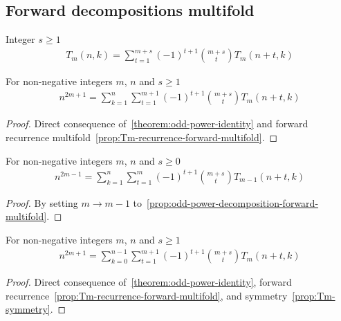 \subsection{Forward decompositions multifold}
\label{subsec:forward-decompositions-multifold}
\begin{proposition}
    Integer $s \geq 1$
    \label{prop:Tm-recurrence-forward-multifold}
    \begin{align*}
        T_{m} (n,k) = \sum_{t=1}^{m+s} (-1)^{t+1} \binom{m+s}{t} T_{m} (n+t, k)
    \end{align*}
\end{proposition}

\begin{proposition}
    \label{prop:odd-power-decomposition-forward-multifold}
    For non-negative integers $m$, $n$ and $s \geq 1$
    \begin{align*}
        n^{2m+1} = \sum_{k=1}^{n} \sum_{t=1}^{m+1} (-1)^{t+1} \binom{m+s}{t} T_{m} (n+t, k)
    \end{align*}
    \begin{proof}
        Direct consequence of~\eqref{theorem:odd-power-identity}
        and forward recurrence multifold~\eqref{prop:Tm-recurrence-forward-multifold}.
    \end{proof}
\end{proposition}

\begin{proposition}
    \label{prop:odd-power-decomposition-forward-m-1-multifold}
    For non-negative integers $m$, $n$ and $s\geq 0$
    \begin{align*}
        n^{2m-1} = \sum_{k=1}^{n} \sum_{t=1}^{m} (-1)^{t+1} \binom{m+s}{t} T_{m-1} (n+t, k)
    \end{align*}
    \begin{proof}
        By setting $m \rightarrow m-1$ to~\eqref{prop:odd-power-decomposition-forward-multifold}.
    \end{proof}
\end{proposition}

\begin{proposition}
    \label{prop:odd-power-decomposition-forward-shifted-multifold}
    For non-negative integers $m$, $n$ and $s\geq 1$
    \begin{align*}
        n^{2m+1} = \sum_{k=0}^{n-1} \sum_{t=1}^{m+1} (-1)^{t+1} \binom{m+s}{t} T_{m} (n+t, k)
    \end{align*}
    \begin{proof}
        Direct consequence of~\eqref{theorem:odd-power-identity},
        forward recurrence~\eqref{prop:Tm-recurrence-forward-multifold}, and symmetry~\eqref{prop:Tm-symmetry}.
    \end{proof}
\end{proposition}

